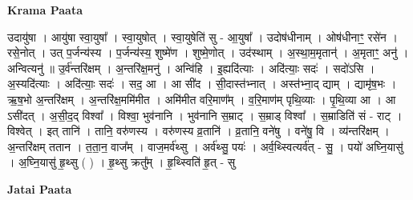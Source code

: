 \documentclass[17pt]{extarticle}
\begin{document}
\textbf{Krama Paata} \newline

उदायु॑षा । आयु॑षा स्वा॒युषा᳚ । स्वा॒युषोत् । स्वा॒युषेति॑ सु - आ॒युषा᳚ । उदोष॑धीनाम् । ओष॑धीनाꣳ॒॒ रसे॑न । रसे॒नोत् । उत् प॒र्जन्य॑स्य । प॒र्जन्य॑स्य॒ शुष्मे॑ण । शुष्मे॒णोत् । उद॑स्थाम् । अ॒स्था॒म॒मृतान्॑ । अ॒मृताꣳ॒॒ अनु॑ । अन्वित्यनु॑ ॥ उ॒र्व॑न्तरि॑क्षम् । अ॒न्तरि॑क्ष॒मनु॑ । अन्वि॑हि । इ॒ह्यदि॑त्याः । अदि॑त्याः॒ सदः॑ । सदो॑ऽसि । अ॒स्यदि॑त्याः । अदि॑त्याः॒ सदः॑ । सद॒ आ । आ सी॑द । सी॒दास्त॑भ्नात् । अस्त॑भ्ना॒द् द्याम् । द्यामृ॑ष॒भः । ऋ॒ष॒भो अ॒न्तरि॑क्षम् । अ॒न्तरि॑क्ष॒ममि॑मीत । अमि॑मीत वरि॒माण᳚म् । व॒रि॒माण॑म् पृथि॒व्याः । पृ॒थि॒व्या आ । आ ऽसी॑दत् । अ॒सी॒द॒द् विश्वा᳚ । विश्वा॒ भुव॑नानि । भुव॑नानि स॒म्राट् । 
स॒म्राड् विश्वा᳚ । स॒म्राडिति॑ सं - राट् । विश्वेत् । इत् तानि॑ । तानि॒ वरु॑णस्य । वरु॑णस्य व्र॒तानि॑ । व्र॒तानि॒ वने॑षु । वने॑षु॒ वि । व्य॑न्तरि॑क्षम् । अ॒न्तरि॑क्षम् ततान । त॒ता॒न॒ वाज᳚म् । वाज॒मर्व॑थ्सु । अर्व॑थ्सु॒ पयः॑ । अर्व॒थ्स्वित्यर्व॑त् - सु॒ । पयो॑ अघ्नि॒यासु॑ । अ॒घ्नि॒यासु॑ हृ॒थ्सु ( ) । हृ॒थ्सु क्रतु᳚म् । हृ॒थ्स्विति॑ हृ॒त् - सु \newline

\textbf{Jatai Paata} \newline
\end{document}
